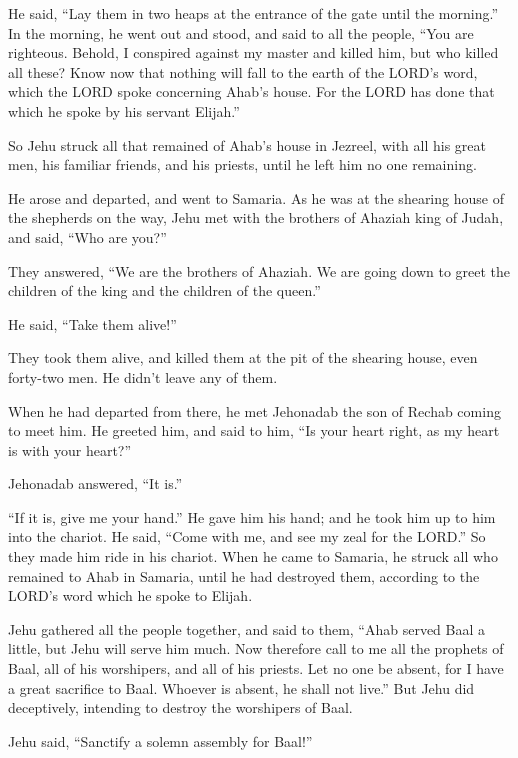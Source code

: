 He said, “Lay them in two heaps at the entrance of the gate until the morning.”
\myverse{}In the morning, he went out and stood, and said to all the people, “You are
righteous. Behold, I conspired against my master and killed him, but who killed all these?
\myverse{}Know now that nothing will fall to the earth of the LORD’s word, which the
LORD spoke concerning Ahab’s house. For the LORD has done that which he spoke by his servant Elijah.”

\myverse{}So Jehu struck all that remained of Ahab’s house in Jezreel,
with all his great men, his familiar friends, and his priests, until he left him no one remaining.

\myverse{}He arose and departed, and went to Samaria. As he was at the
shearing house of the shepherds on the way,
\myverse{}Jehu met with the brothers of Ahaziah king of Judah, and said, “Who are you?”

They answered, “We are the brothers of Ahaziah. We are going down to greet the children of
the king and the children of the queen.”

\myverse{}He said, “Take them alive!”

They took them alive, and killed them at the pit of the shearing house, even forty-two men.
He didn’t leave any of them.

\myverse{}When he had departed from there, he met Jehonadab the son of
Rechab coming to meet him. He greeted him, and said to him, “Is your heart right, as my heart is with
your heart?”

Jehonadab answered, “It is.”

“If it is, give me your hand.” He gave him his hand; and he took him up to him into the chariot.
\myverse{}He said, “Come with me, and see my zeal for the LORD.” So they made him ride
in his chariot.
\myverse{}When he came to Samaria, he struck all who remained to Ahab in Samaria, until
he had destroyed them, according to the LORD’s word which he spoke to Elijah.

\myverse{}Jehu gathered all the people together, and said to them, “Ahab
served Baal a little, but Jehu will serve him much.
\myverse{}Now therefore call to me all the prophets of Baal, all of his worshipers,
and all of his priests. Let no one be absent, for I have a great sacrifice to Baal. Whoever is absent,
he shall not live.” But Jehu did deceptively, intending to destroy the worshipers of Baal.

\myverse{}Jehu said, “Sanctify a solemn assembly for Baal!”

